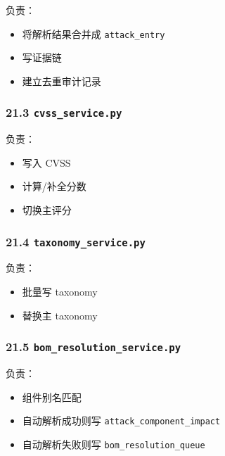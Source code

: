 \documentclass[UTF8]{ctexart}
\providecommand{\tightlist}{%
  \setlength{\itemsep}{0pt}\setlength{\parskip}{0pt}}
\begin{document}
负责：

\begin{itemize}
\tightlist
\item
  将解析结果合并成 \texttt{attack\_entry}
\item
  写证据链
\item
  建立去重审计记录
\end{itemize}

\hypertarget{cvss_service.py}{%
\subsubsection{\texorpdfstring{21.3
\texttt{cvss\_service.py}}{21.3 cvss\_service.py}}\label{cvss_service.py}}

负责：

\begin{itemize}
\tightlist
\item
  写入 CVSS
\item
  计算/补全分数
\item
  切换主评分
\end{itemize}

\hypertarget{taxonomy_service.py}{%
\subsubsection{\texorpdfstring{21.4
\texttt{taxonomy\_service.py}}{21.4 taxonomy\_service.py}}\label{taxonomy_service.py}}

负责：

\begin{itemize}
\tightlist
\item
  批量写 taxonomy
\item
  替换主 taxonomy
\end{itemize}

\hypertarget{bom_resolution_service.py}{%
\subsubsection{\texorpdfstring{21.5
\texttt{bom\_resolution\_service.py}}{21.5 bom\_resolution\_service.py}}\label{bom_resolution_service.py}}

负责：

\begin{itemize}
\tightlist
\item
  组件别名匹配
\item
  自动解析成功则写 \texttt{attack\_component\_impact}
\item
  自动解析失败则写 \texttt{bom\_resolution\_queue}
\end{itemize}
\end{document}
